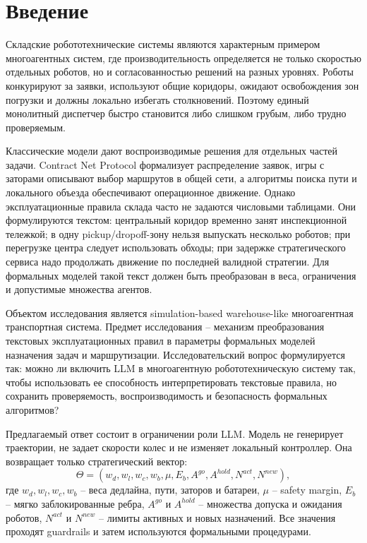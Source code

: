 \documentclass[runningheads]{llncs}
\begin{document}
\section{Введение}

Складские робототехнические системы являются характерным примером многоагентных систем, где производительность определяется не только скоростью отдельных роботов, но и согласованностью решений на разных уровнях. Роботы конкурируют за заявки, используют общие коридоры, ожидают освобождения зон погрузки и должны локально избегать столкновений. Поэтому единый монолитный диспетчер быстро становится либо слишком грубым, либо трудно проверяемым.

Классические модели дают воспроизводимые решения для отдельных частей задачи. Contract Net Protocol формализует распределение заявок, игры с заторами описывают выбор маршрутов в общей сети, а алгоритмы поиска пути и локального объезда обеспечивают операционное движение. Однако эксплуатационные правила склада часто не задаются числовыми таблицами. Они формулируются текстом: центральный коридор временно занят инспекционной тележкой; в одну pickup/dropoff-зону нельзя выпускать несколько роботов; при перегрузке центра следует использовать обходы; при задержке стратегического сервиса надо продолжать движение по последней валидной стратегии. Для формальных моделей такой текст должен быть преобразован в веса, ограничения и допустимые множества агентов.

Объектом исследования является simulation-based warehouse-like многоагентная транспортная система. Предмет исследования -- механизм преобразования текстовых эксплуатационных правил в параметры формальных моделей назначения задач и маршрутизации. Исследовательский вопрос формулируется так: можно ли включить LLM в многоагентную робототехническую систему так, чтобы использовать ее способность интерпретировать текстовые правила, но сохранить проверяемость, воспроизводимость и безопасность формальных алгоритмов?

Предлагаемый ответ состоит в ограничении роли LLM. Модель не генерирует траектории, не задает скорости колес и не изменяет локальный контроллер. Она возвращает только стратегический вектор:
\[
\Theta=(w_d,w_l,w_c,w_b,\mu,E_b,A^{go},A^{hold},N^{act},N^{new}),
\]
где $w_d,w_l,w_c,w_b$ -- веса дедлайна, пути, заторов и батареи, $\mu$ -- safety margin, $E_b$ -- мягко заблокированные ребра, $A^{go}$ и $A^{hold}$ -- множества допуска и ожидания роботов, $N^{act}$ и $N^{new}$ -- лимиты активных и новых назначений. Все значения проходят guardrails и затем используются формальными процедурами.
\end{document}
